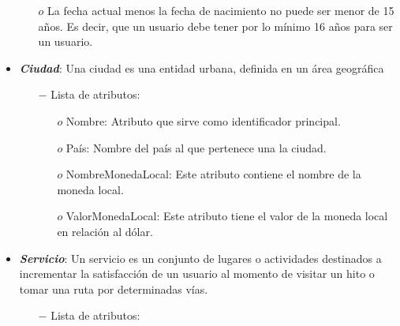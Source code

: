 \documentclass[a4paper]{article}
\begin{document}
\begin{itemize}
{\begin{itemize}
\begin{itemize}
     \item[$o$]  La fecha actual menos la fecha de nacimiento no puede ser menor de 15 años. Es decir, que un usuario debe tener por lo mínimo 16 años para ser un usuario.

      \end{itemize}

    \end{itemize}

}



\item{
	\textbf{\textit{Ciudad}}:  Una ciudad es una entidad urbana, definida en un área geográfica
  		
     \begin{itemize}   
  		\item[$-$] Lista de atributos:

	\begin{itemize}
		\item[$o$] Nombre: Atributo que sirve como identificador principal.
\item[$o$]País: Nombre del país al que pertenece una la ciudad.
\item[$o$]NombreMonedaLocal: Este atributo contiene el nombre de la moneda local.
\item[$o$]ValorMonedaLocal: Este atributo tiene el valor de la moneda local en relación al dólar.

        



	\end{itemize}



    \end{itemize}

}








\item{
	\textbf{\textit{Servicio}}: Un servicio es un conjunto de lugares o actividades destinados a incrementar la satisfacción de un usuario al momento de visitar un hito o tomar una ruta por determinadas vías.
 
  		
     \begin{itemize}   
  		\item[$-$] Lista de atributos:
        

\end{itemize}}
\end{itemize}
\end{document}
